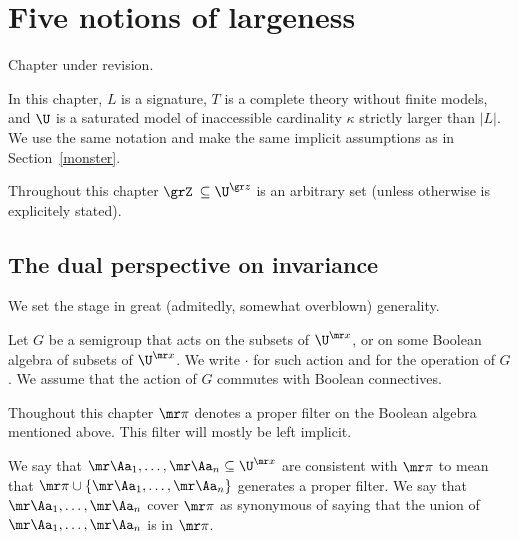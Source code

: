 \chapter{Five notions of largeness}
\label{actions}

\def\medrel#1{\parbox[t]{5ex}{$\displaystyle\hfil #1$}}
\def\ceq#1#2#3{\parbox[t]{17ex}{$\displaystyle #1$}\medrel{#2}{$\displaystyle #3$}}

\noindent\llap{\textcolor{red}{\Large\warning}\kern1.5ex}\ignorespaces
Chapter under revision.

In this chapter, $L$ is a signature, $T$ is a complete theory without finite models, and $\U$ is a saturated model of inaccessible cardinality $\kappa$ strictly larger than $|L|$.
We use the same notation and make the same implicit assumptions as in Section~\ref{monster}.

Throughout this chapter \emph{$\grZ$\/} $\subseteq\U^{\gr z}$ is an arbitrary set (unless otherwise is explicitely stated).

\section{The dual perspective on invariance}\label{dual_perspective}

We set the stage in great (admitedly, somewhat overblown) generality.

Let \emph{$G$\/} be a semigroup that acts on the subsets of $\U^{\mr x}$, or on some Boolean algebra of subsets of $\U^{\mr x}$.
We write ${\cdot}$ for such action and for the operation of $G$.
We assume that the action of $G$ commutes with Boolean connectives.

Thoughout this chapter \emph{${\mr\pi}$\/} denotes a proper filter on the Boolean algebra mentioned above.
This filter will mostly be left implicit.

We say that ${\mr\Aa_1},\dots,{\mr\Aa_n}\subseteq\U^{\mr x}$ are consistent with ${\mr\pi}$ to mean that ${\mr\pi}\cup\{{\mr\Aa_1},\dots,{\mr\Aa_n}\}$ generates a proper filter.
We say that ${\mr\Aa_1},\dots,{\mr\Aa_n}$ cover ${\mr\pi}$ as synonymous of saying that the union of ${\mr\Aa_1},\dots,{\mr\Aa_n}$ is in ${\mr\pi}$.

